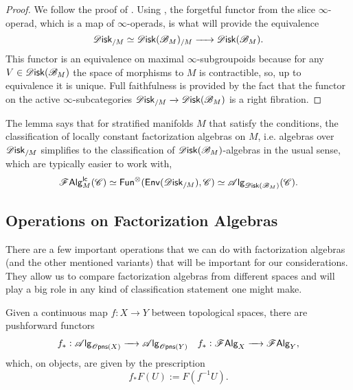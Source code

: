 \documentclass[../text.tex]{subfiles}
\begin{document}
\begin{proof}
    We follow the proof of \cite[cor.2.33]{aft_fhstrat}. Using , the forgetful functor from the slice $\infty$-operad, which is a map of $\infty$-operads, is what will provide the equivalence
    \begin{equation}
        \disk_{/M} \simeq \disk(\bstr_M)_{/M} \xrightarrow{\ \ \ \ } \disk(\bstr_M).
    \end{equation}
    This functor is an equivalence on maximal $\infty$-subgroupoids because for any $V \in \disk(\bstr_M)$ the space of morphisms to $M$ is contractible, so, up to equivalence it is unique. Full faithfulness is provided by the fact that the functor on the active $\infty$-subcategories $\disk_{/M} \xrightarrow{} \disk(\bstr_M)$ is a right fibration. 
\end{proof}

The lemma says that for stratified manifolds $M$ that satisfy the conditions, the classification of locally constant factorization algebras on $M$, i.e. algebras over $\disk_{/M}$ simplifies to the classification of $\disk(\bstr_M)$-algebras in the usual sense, which are typically easier to work with,
%
\begin{equation}
    \lcfa_M (\catC) \simeq \mathsf{Fun}^\otimes (\mathsf{Env}(\disk_{/M}), \catC) \simeq \alg{\disk(\bstr_M)} (\catC).
\end{equation}

\subsection{Operations on Factorization Algebras}

There are a few important operations that we can do with factorization algebras (and the other mentioned variants) that will be important for our considerations. They allow us to compare factorization algebras from different spaces and will play a big role in any kind of classification statement one might make.


\begin{proposition}\label{prop:pushforward}
    Given a continuous map $f:X \rightarrow Y$ between topological spaces, there are pushforward functors
    \begin{align}
        &f_*: \alg{\opens[s](X)} \xrightarrow{\quad} \alg{\opens[s](Y)} &f_*: \falg_X \xrightarrow{\quad} \falg_Y,
    \end{align}
    which, on objects, are given by the prescription
    \begin{equation}
        f_*F (U) := F(f^{-1}U).
    \end{equation}
\end{proposition}
\end{document}
